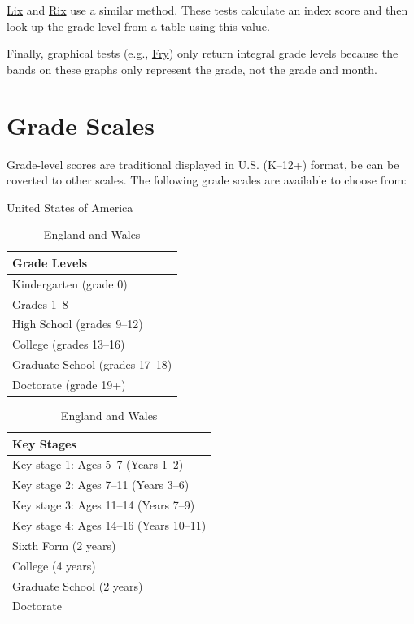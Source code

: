 \documentclass[
]{book}
\theoremstyle{definition}
\theoremstyle{definition}
\theoremstyle{definition}
\theoremstyle{definition}
\theoremstyle{remark}
\begin{document}
\protect\hyperlink{lix-test}{Lix} and \protect\hyperlink{rix-test}{Rix} use a similar method. These tests calculate an index score and then look up the grade level from a table using this value.

Finally, graphical tests (e.g., \protect\hyperlink{fry-test}{Fry}) only return integral grade levels because the bands on these graphs only represent the grade, not the grade and month.

\hypertarget{grade-scales}{%
\section{Grade Scales}\label{grade-scales}}

Grade-level scores are traditional displayed in U.S. (K--12+) format, be can be coverted to other scales. The following grade scales are available to choose from:

\begin{table}[!htb]
    \begin{minipage}{.5\linewidth}
      \caption{United States of America}
\begin{tabular}[t]{l}
\toprule
Grade Levels\\
\midrule
Kindergarten (grade 0)\\
Grades 1–8\\
High School (grades 9–12)\\
College (grades 13–16)\\
Graduate School (grades 17–18)\\
Doctorate (grade 19+)\\
\bottomrule
\end{tabular}\hspace{1cm}
    \end{minipage}%
    \hspace{.1cm}
    \begin{minipage}{.5\linewidth}
      \caption{England and Wales}
\begin{tabular}[t]{l}
\toprule
Key Stages\\
\midrule
Key stage 1: Ages 5–7 (Years 1–2)\\
Key stage 2: Ages 7–11 (Years 3–6)\\
Key stage 3: Ages 11–14 (Years 7–9)\\
Key stage 4: Ages 14–16 (Years 10–11)\\
Sixth Form (2 years)\\
College (4 years)\\
Graduate School (2 years)\\
Doctorate\\
\bottomrule
\end{tabular}\end{minipage}
    \end{table}
\end{document}
